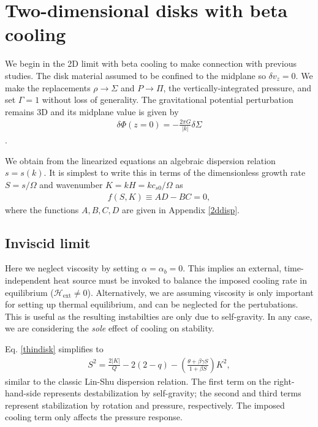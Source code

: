 \section{Two-dimensional disks with beta cooling}\label{result_2d}
We begin in the 2D limit with beta cooling  to make connection 
with previous studies. The disk
material assumed to be confined to the midplane so $\delta v_z=0$. 
We make the replacements 
$\rho \to \Sigma$ and $P\to\Pi$, the vertically-integrated
pressure, and set $\Gamma=1$ without loss of generality. 
The gravitational potential perturbation remains 3D and its midplane
value is given by    
\begin{align}
  \delta \Phi(z=0) = -\frac{2 \pi G}{|k|}\delta\Sigma
\end{align}
\citep{shu70}.
 
We obtain from the linearized equations 
an algebraic dispersion relation $s = s(k)$. It is simplest
to write this  
in terms of the dimensionless growth rate $S = s/\Omega$ and
wavenumber $K=kH = k c_{s0}/\Omega$ as
\begin{align}\label{thindisk}
  f(S,K)\equiv AD - BC = 0,   
\end{align}
where the functions $A,B,C,D$ are given in Appendix \ref{2ddisp}. 

\subsection{Inviscid limit}\label{2d_inviscid}
Here we neglect viscosity by setting 
$\alpha = \alpha_b = 0$. This implies an external,
time-independent heat source must be invoked to balance the imposed
cooling rate in equilibrium ($\mathcal{H}_\mathrm{ext}\neq 0$). Alternatively, we are assuming 
viscosity is only important for setting up thermal equilibrium, and
can be neglected for the pertubations. This is useful as the resulting
instabilties are only due to self-gravity.  In any case, we are
considering the \emph{sole} effect of cooling on stability. 

Eq. \ref{thindisk} simplifies to  
\begin{align}\label{inviscid}
  S^2 = \frac{2|K|}{Q} - 2(2-q) - \left(\frac{\theta + \beta \gamma
    S}{1+\beta S}\right)K^2, 
\end{align}
similar to the classic Lin-Shu dispersion relation. The first term on
the right-hand-side represents destabilization by self-gravity; 
the second and third terms represent stabilization by rotation and
pressure, respectively. The imposed cooling term only affects the
pressure response. 

